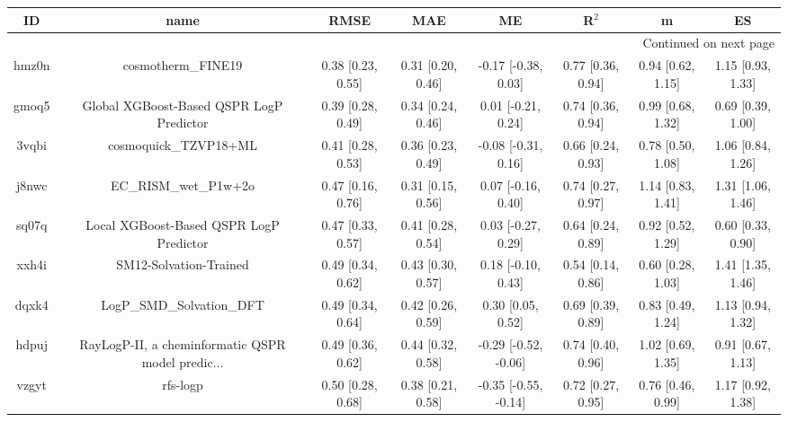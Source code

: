 \documentclass{article}
\begin{document}
\begin{center}
\begin{longtable}{|cccccccc|}
\toprule
    ID &                                               name &               RMSE &                MAE &                    ME &              R$^2$ &                    m &                    ES \\
\midrule
\endhead
\midrule
\multicolumn{8}{r}{{Continued on next page}} \\
\midrule
\endfoot

\bottomrule
\endlastfoot
 hmz0n &                                 cosmotherm\_FINE19 &  0.38 [0.23, 0.55] &  0.31 [0.20, 0.46] &   -0.17 [-0.38, 0.03] &  0.77 [0.36, 0.94] &    0.94 [0.62, 1.15] &     1.15 [0.93, 1.33] \\
 gmoq5 &           Global XGBoost-Based QSPR LogP Predictor &  0.39 [0.28, 0.49] &  0.34 [0.24, 0.46] &    0.01 [-0.21, 0.24] &  0.74 [0.36, 0.94] &    0.99 [0.68, 1.32] &     0.69 [0.39, 1.00] \\
 3vqbi &                              cosmoquick\_TZVP18+ML &  0.41 [0.28, 0.53] &  0.36 [0.23, 0.49] &   -0.08 [-0.31, 0.16] &  0.66 [0.24, 0.93] &    0.78 [0.50, 1.08] &     1.06 [0.84, 1.26] \\
 j8nwc &                              EC\_RISM\_wet\_P1w+2o &  0.47 [0.16, 0.76] &  0.31 [0.15, 0.56] &    0.07 [-0.16, 0.40] &  0.74 [0.27, 0.97] &    1.14 [0.83, 1.41] &     1.31 [1.06, 1.46] \\
 sq07q &            Local XGBoost-Based QSPR LogP Predictor &  0.47 [0.33, 0.57] &  0.41 [0.28, 0.54] &    0.03 [-0.27, 0.29] &  0.64 [0.24, 0.89] &    0.92 [0.52, 1.29] &     0.60 [0.33, 0.90] \\
 xxh4i &                             SM12-Solvation-Trained &  0.49 [0.34, 0.62] &  0.43 [0.30, 0.57] &    0.18 [-0.10, 0.43] &  0.54 [0.14, 0.86] &    0.60 [0.28, 1.03] &     1.41 [1.35, 1.46] \\
 dqxk4 &                          LogP\_SMD\_Solvation\_DFT &  0.49 [0.34, 0.64] &  0.42 [0.26, 0.59] &     0.30 [0.05, 0.52] &  0.69 [0.39, 0.89] &    0.83 [0.49, 1.24] &     1.13 [0.94, 1.32] \\
 hdpuj &  RayLogP-II, a cheminformatic QSPR model predic... &  0.49 [0.36, 0.62] &  0.44 [0.32, 0.58] &  -0.29 [-0.52, -0.06] &  0.74 [0.40, 0.96] &    1.02 [0.69, 1.35] &     0.91 [0.67, 1.13] \\
 vzgyt &                                           rfs-logp &  0.50 [0.28, 0.68] &  0.38 [0.21, 0.58] &  -0.35 [-0.55, -0.14] &  0.72 [0.27, 0.95] &    0.76 [0.46, 0.99] &     1.17 [0.92, 1.38] \\

\end{longtable}
\end{center}
\end{document}
